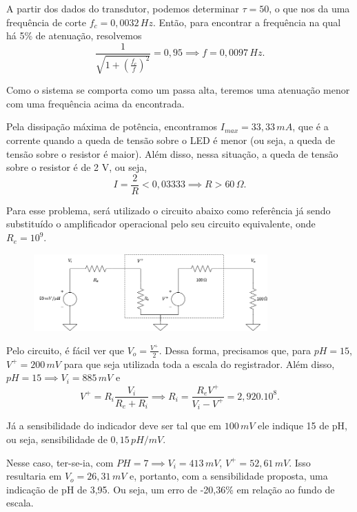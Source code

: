 \documentclass[a4paper]{report}
\begin{document}

A partir dos dados do transdutor, podemos determinar $\tau=50$, o que nos da uma frequência de corte $f_c = 0,0032\,Hz$. Então, para encontrar a frequência na qual há 5\% de atenuação, resolvemos \[
\frac{1}{\sqrt{1+ \left( \frac{f_c}{f} \right) ^2} } = 0,95 \implies f = 0,0097\,Hz
.\] 

Como o sistema se comporta como um passa alta, teremos uma atenuação menor com uma frequência acima da encontrada.


Pela dissipação máxima de potência, encontramos $I_{max} = 33,33\,mA$, que é a corrente quando a queda de tensão sobre o LED é menor (ou seja, a queda de tensão sobre o resistor é maior). Além disso, nessa situação, a queda de tensão sobre o resistor é de 2 V, ou seja, \[
I = \frac{2}{R} < 0,03333 \implies R > 60\,\Omega
.\]


Para esse problema, será utilizado o circuito abaixo como referência já sendo substituído o amplificador operacional pelo seu circuito equivalente, onde $R_e = 10^9$.

\begin{figure}[H]
    \centering
    \includegraphics[width=0.8\textwidth]{figures/lista1-10.png}
\end{figure}


Pelo circuito, é fácil ver que $V_o = \frac{V^+}{2}$. Dessa forma, precisamos que, para $pH=15$, $V^+=200\,mV$ para que seja utilizada toda a escala do registrador. Além disso, $pH=15\implies V_i = 885\,mV$ e \[
V^+ = R_i \frac{V_i}{R_e+R_i} \implies R_i = \frac{R_e V^+}{V_i - V^+} = 2,920.10^8
.\]

Já a sensibilidade do indicador deve ser tal que em $100\,mV$ ele indique 15 de pH, ou seja, sensibilidade de $0,15\,pH/mV$.


Nesse caso, ter-se-ia, com $PH=7 \implies V_i = 413\,mV$, $V^+ = 52,61\,mV$. Isso resultaria em $V_o = 26,31\,mV$ e, portanto, com a sensibilidade proposta, uma indicação de pH de 3,95. Ou seja, um erro de -20,36\% em relação ao fundo de escala.
\end{document}
